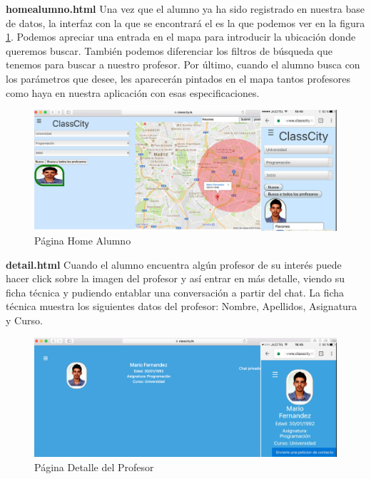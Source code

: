 \textbf{homealumno.html} Una vez que el alumno ya ha sido registrado en nuestra base de datos, la interfaz con la que se encontrará el es la que podemos ver en la figura \ref{img:homealumnoclasscity}.
Podemos apreciar una entrada en el mapa para introducir la ubicación donde queremos buscar. También podemos diferenciar los filtros de búsqueda que tenemos para buscar a nuestro profesor. Por último, cuando el alumno busca con los parámetros que desee, les aparecerán pintados en el mapa tantos profesores como haya en nuestra aplicación con esas especificaciones.
\begin{figure}[!h]
    \centering
    \includegraphics[width=160mm]{img/templates/homealumno.png}
    \caption{Página Home Alumno}
    \label{img:homealumnoclasscity}
\end{figure}

\textbf{detail.html} Cuando el alumno encuentra algún profesor de su interés puede hacer click sobre la imagen del profesor y así entrar en más detalle, viendo su ficha técnica y pudiendo entablar una conversación a partir del chat. La ficha técnica muestra los siguientes datos del profesor: Nombre, Apellidos, Asignatura y Curso.
\begin{figure}[!h]
    \centering
    \includegraphics[width=160mm]{img/templates/detailprof.png}
    \caption{Página Detalle del Profesor}
    \label{img:detailprofesorclasscity}
\end{figure}

